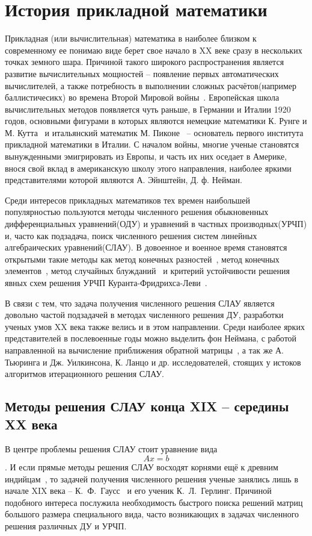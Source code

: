 \section{История прикладной математики}
Прикладная (или вычислительная) математика в наиболее близком к современному ее понимаю виде берет свое начало в XX веке сразу в нескольких точках земного шара. Причиной такого широкого распространения является развитие вычислительных мощностей -- появление первых автоматических вычислителей, а также потребность в выполнении сложных расчётов(например баллистичесикх) во времена Второй Мировой войны~\cite{benzi}. Европейская школа вычислительных методов появляется чуть раньше, в Германии и Италии 1920 годов, основными фигурами в которых являются немецкие математики К. Рунге и М. Кутта~\cite{w:runge} и итальянский математик М. Пиконе~\cite{w:picone} -- основатель первого института прикладной математики в Италии. С началом войны, многие ученые становятся вынужденными эмигрировать из Европы, и часть их них оседает в Америке, внося свой вклад в американскую школу этого направления, наиболее яркими представителями которой являются А. Эйнштейн, Д. ф. Нейман.


Среди интересов прикладных математиков тех времен наибольшей популярностью пользуются методы численного решения обыкновенных дифференциальных уравнений(ОДУ) и уравнений в частных производных(УРЧП) и, часто как подзадача, поиск численного решения систем линейных алгебраических уравнений(СЛАУ). В довоенное и военное время становятся открытыми такие методы как метод конечных разностей~\cite{finite_dif_pde}, метод конечных элементов~\cite{cfe_pde}, метод случайных блужданий~\cite{w:random_walk} и критерий устойчивости решения явных схем решения УРЧП Куранта-Фридрихса-Леви~\cite{cfl_pde}.


В связи с тем, что задача получения численного решения СЛАУ является довольно частой подзадачей в методах численного решения ДУ, разработки ученых умов XX века также велись и в этом направлении. Среди наиболее ярких представителей в послевоенные годы можно выделить фон Неймана, с работой направленной на вычисление приближения обратной матрицы~\cite{von_matrix}, а так же А. Тьюринга и Дж. Уилкинсона, К. Ланцо и др. исследователей, стоящих у истоков алгоритмов итерационного решения СЛАУ.


\subsection{Методы решения СЛАУ конца XIX -- середины XX века}
В центре проблемы решения СЛАУ стоит уравнение вида \[Ax = b\]. И если прямые методы решения СЛАУ восходят корнями ещё к древним индийцам~\cite{benzi}, то задачей получения численного решения ученые занялись лишь в начале XIX века -- К.~Ф.~Гаусс~\cite{w:gauss} и его ученик К.~Л.~Герлинг. Причиной подобного интереса послужила необходимость быстрого поиска решений матриц большого размера специального вида, часто возникающих в задачах численного решения различных ДУ и УРЧП.


